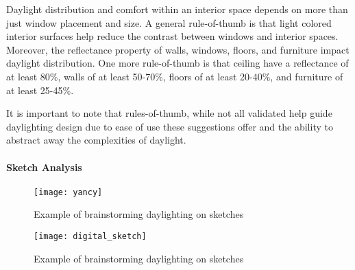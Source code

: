   Daylight distribution and comfort within an interior space depends on more than just window placement and size.
  A general rule-of-thumb is that light colored interior surfaces help reduce the contrast between windows and interior spaces\cite{Leslie}.
  Moreover, the reflectance property of walls, windows, floors, and furniture impact daylight distribution.
  One more rule-of-thumb is that ceiling have a reflectance of at least 80\%, walls of at least 50-70\%, floors of at least 20-40\%, and furniture of at least 25-45\%\cite{reinhart_lecture}.

  It is important to note that rules-of-thumb, while not all validated help guide daylighting design due to ease of use these suggestions offer and the ability to abstract away the complexities of daylight.

  \paragraph{Sketch Analysis}
  \begin{figure}[h]
    \centering
    \begin{minipage}[b]{0.4\textwidth}
      \centering
      \texttt{[image: yancy]}
      \caption{Example of brainstorming daylighting on sketches}
      \label{fig:yancy}
    \end{minipage}
    \hfill
    \begin{minipage}[b]{0.4\textwidth}
      \centering
      \texttt{[image: digital\_sketch]}
      \caption{Example of brainstorming daylighting on sketches}
      \label{fig:digital_sketch}
    \end{minipage}
  \end{figure}


